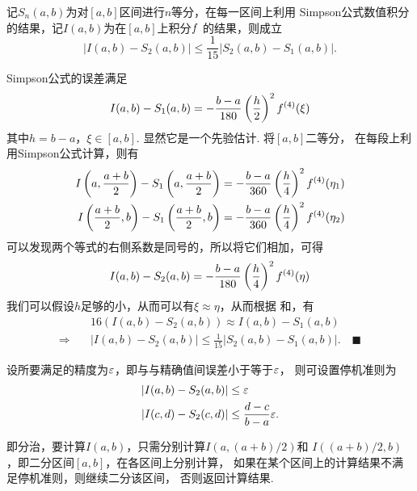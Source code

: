   \begin{thm}[Simpson公式的后验估计]
    记$S_n(a, b)$为对$[a, b]$区间进行$n$等分，在每一区间上利用
    Simpson公式数值积分的结果，记$I(a, b)$为在$[a, b]$上积分$\mathnormal{f}$
    的结果，则成立
    \[
      \left| I(a, b) - S_2(a, b) \right|
      \le \frac{1}{15}| S_2(a, b) - S_1(a, b)|.
    \]
  \end{thm}
  \proof
    Simpson公式的误差满足
    \begin{equation}
      \label{equ: Simpson公式误差}
      I(a, b) - S_1(a, b) = -\frac{b-a}{180}\left(\frac{h}{2}\right)^2\mathnormal{f}^{(4)}(\xi)
    \end{equation}
    其中$h = b-a$，$\xi\in[a, b]$. 显然它是一个先验估计. 将$[a, b]$二等分，
    在每段上利用Simpson公式计算，则有
    \[\begin{split}
      I\left(a, \frac{a+b}{2}\right) - S_1\left(a, \frac{a+b}{2}\right)
      & = -\frac{b-a}{360}\left(\frac{h}{4}\right)^2\mathnormal{f}^{(4)}(\eta_1) \\
      I\left(\frac{a+b}{2}, b\right) - S_1\left(\frac{a+b}{2}, b\right)
      & = -\frac{b-a}{360}\left(\frac{h}{4}\right)^2\mathnormal{f}^{(4)}(\eta_2)
    \end{split}\]
    可以发现两个等式的右侧系数是同号的，所以将它们相加，可得
    \begin{equation}
      \label{equ: Simpson2公式误差}
      I(a, b) - S_2(a, b) = -\frac{b-a}{180}\left(\frac{h}{4}\right)^2\mathnormal{f}^{(4)}(\eta)
    \end{equation}
    我们可以假设$h$足够的小，从而可以有$\xi\approx\eta$，从而根据
    和，有
    \[\begin{split}
       &16(I(a, b) - S_2(a, b)) \approx I(a, b) - S_1(a, b) \\
      \Rightarrow\quad& |I(a, b) - S_2(a, b)| \le \frac{1}{15}|S_2(a, b) - S_1(a, b)|.
      \quad\blacksquare
    \end{split}\]

  \begin{thm}[停机准则]
    设所要满足的精度为$\varepsilon$，即与与精确值间误差小于等于$\varepsilon$，
    则可设置停机准则为
    \[\begin{split}
      |I(a, b) - S_2(a, b)| &\le \varepsilon \\
      |I(c, d) - S_2(c, d)| &\le \frac{d-c}{b-a}\varepsilon.
    \end{split}\]
  \end{thm}

  \begin{alg}[自适应方法]
    即分治，要计算$I(a, b)$，只需分别计算$I(a, (a+b)/2)$和
    $I((a+b)/2, b)$，即二分区间$[a, b]$，在各区间上分别计算，
    如果在某个区间上的计算结果不满足停机准则，则继续二分该区间，
    否则返回计算结果.
  \end{alg}

